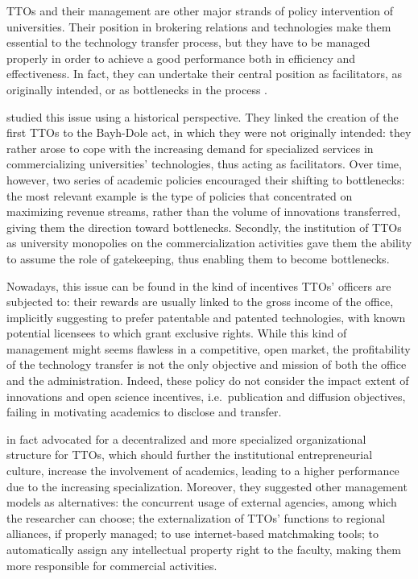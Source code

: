 TTOs and their management are other major strands of policy intervention of universities. Their position in brokering relations and technologies make them essential to the technology transfer process, but they have to be managed properly in order to achieve a good performance both in efficiency and effectiveness. In fact, they can undertake their central position as facilitators, as originally intended, or as bottlenecks in the process \citep{Siegel2003a, Geuna2009}. 

\citet{Litan2008} studied this issue using a historical perspective. They linked the creation of the first TTOs to the Bayh-Dole act, in which they were not originally intended: they rather arose to cope with the increasing demand for specialized services in commercializing universities' technologies, thus acting as facilitators. Over time, however, two series of academic policies encouraged their shifting to bottlenecks: the most relevant example is the type of policies that concentrated on maximizing revenue streams, rather than the volume of innovations transferred, giving them the direction toward bottlenecks. Secondly, the institution of TTOs as university monopolies on the commercialization activities gave them the ability to assume the role of gatekeeping, thus enabling them to become bottlenecks.

Nowadays, this issue can be found in the kind of incentives TTOs' officers are subjected to: their rewards are usually linked to the gross income of the office, implicitly suggesting to prefer patentable and patented technologies, with known potential licensees to which grant exclusive rights. While this kind of management might seems flawless in a competitive, open market, the profitability of the technology transfer is not the only objective and mission of both the office and the administration. Indeed, these policy do not consider the impact extent of innovations and open science incentives, i.e.\ publication and diffusion objectives, failing in motivating academics to disclose and transfer. 

\citet{Litan2008} in fact advocated for a decentralized and more specialized organizational structure for TTOs, which should further the institutional entrepreneurial culture, increase the involvement of academics, leading to a higher performance due to the increasing specialization. Moreover, they suggested other management models as alternatives: the concurrent usage of external agencies, among which the researcher can choose; the externalization of TTOs' functions to regional alliances, if properly managed; to use internet-based matchmaking tools; to automatically assign any intellectual property right to the faculty, making them more responsible for commercial activities. 

